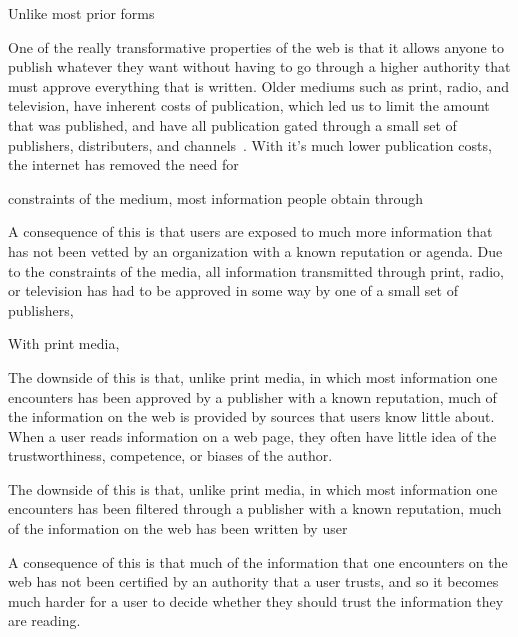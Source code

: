 % 

% 


Unlike most prior forms 


One of the really transformative properties of the web is that it allows anyone to publish whatever they want without having to go through a higher authority that must approve everything that is written. Older mediums such as print, radio, and television, have inherent costs of publication, which led us to limit the amount that was published, and have all publication gated through a small set of publishers, distributers, and channels~\cite{shirky?}. With it's much lower publication costs, the internet has removed the need for 

constraints of the medium, most information people obtain through 

A consequence of this is that users are exposed to much more information that has not been vetted by an organization with a known reputation or agenda. Due to the constraints of the media, all information transmitted through print, radio, or television has had to be approved in some way by one of a small set of publishers, 

With print media,


The downside of this is that, unlike print media, in which most information one encounters has been approved by a publisher with a known reputation, much of the information on the web is provided by sources that users know little about. When a user reads information on a web page, they often have little idea of the trustworthiness, competence, or biases of the author.


The downside of this is that, unlike print media, in which most information one encounters has been filtered through a publisher with a known reputation, much of the information on the web has been written by user

A consequence of this is that much of the information that one encounters on the web has not been certified by an authority that a user trusts, and so it becomes much harder for a user to decide whether they should trust the information they are reading.

